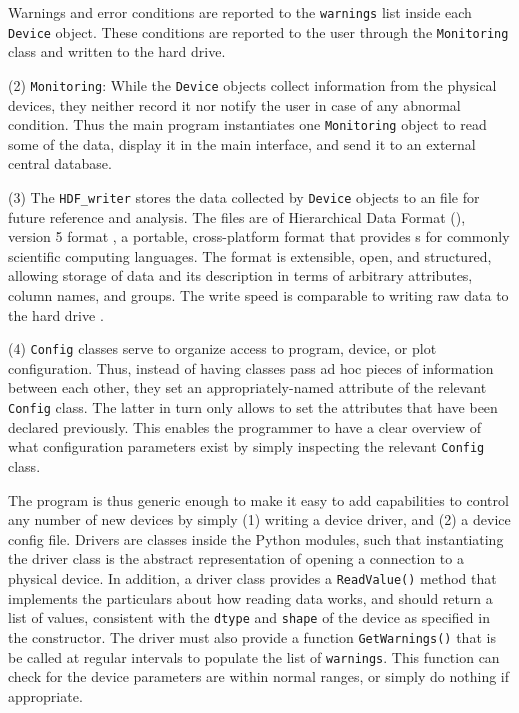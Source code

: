 Warnings and error conditions are reported to the \verb`warnings` list inside
each \verb`Device` object. These conditions are reported to the user through the
\verb`Monitoring` class and written to the hard drive.

(2) \verb`Monitoring`: While the \verb`Device` objects collect information from
the physical devices, they neither record it nor notify the user in case of any
abnormal condition. Thus the main program instantiates one \verb`Monitoring`
object to read some of the data, display it in the main interface, and send it
to an external central database.

(3) The \verb`HDF_writer` stores the data collected by \verb`Device` objects to
an file for future reference and analysis. The files are of Hierarchical Data
Format (\HDF), version 5 format \cite{doecode_9801}, a portable, cross-platform
format that provides \API s for commonly scientific computing languages. The
format is extensible, open, and structured, allowing storage of data and its
description in terms of arbitrary attributes, column names, and groups. The
write speed is comparable to writing raw data to the hard drive
\cite{malaya2010petascale}.

(4) \verb`Config` classes serve to organize access to program, device, or plot
configuration. Thus, instead of having classes pass ad hoc pieces of information
between each other, they set an appropriately-named attribute of the relevant
\verb`Config` class. The latter in turn only allows to set the attributes that
have been declared previously. This enables the programmer to have a clear
overview of what configuration parameters exist by simply inspecting the
relevant \verb`Config` class.

The program is thus generic enough to make it easy to add capabilities to
control any number of new devices by simply (1) writing a device driver, and (2)
a device config file. Drivers are classes inside the Python modules, such that
instantiating the driver class is the abstract representation of opening a
connection to a physical device. In addition, a driver class provides a
\verb`ReadValue()` method that implements the particulars about how reading data
works, and should return a list of values, consistent with the \verb`dtype` and
\verb`shape` of the device as specified in the constructor. The driver must also
provide a function \verb`GetWarnings()` that is be called at regular intervals
to populate the list of \verb`warnings`. This function can check for the device
parameters are within normal ranges, or simply do nothing if appropriate.

